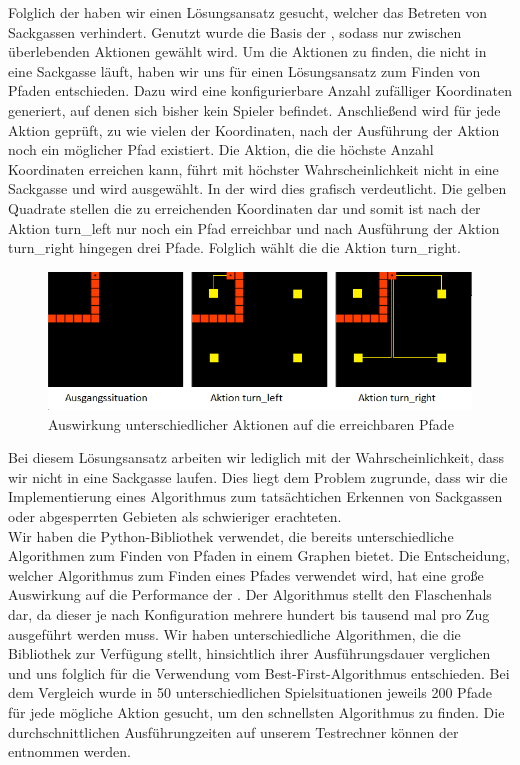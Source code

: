 Folglich der  haben wir einen Lösungsansatz gesucht, welcher das Betreten von Sackgassen
verhindert.
Genutzt wurde die Basis der , sodass nur zwischen überlebenden Aktionen gewählt wird.
Um die Aktionen zu finden, die nicht in eine Sackgasse läuft, haben wir uns für einen Lösungsansatz zum Finden von
Pfaden entschieden.
Dazu wird eine konfigurierbare Anzahl zufälliger Koordinaten generiert, auf denen sich bisher kein Spieler befindet.
Anschließend wird für jede Aktion geprüft, zu wie vielen der Koordinaten, nach der Ausführung der Aktion noch ein
möglicher Pfad existiert.
Die Aktion, die die höchste Anzahl Koordinaten erreichen kann, führt mit höchster Wahrscheinlichkeit
nicht in eine Sackgasse und wird ausgewählt.
In der  wird dies grafisch verdeutlicht.
Die gelben Quadrate stellen die zu erreichenden Koordinaten dar und somit ist nach der Aktion turn\_left nur noch ein
Pfad erreichbar und nach Ausführung der Aktion turn\_right hingegen drei Pfade.
Folglich wählt die  die Aktion turn\_right.

\begin{figure}[htb]
    \centering
    \includegraphics{Bilder/pathfinding_example.png}
    \caption{Auswirkung unterschiedlicher Aktionen auf die erreichbaren Pfade}
    \label{fig:sackgasse-pfade}
\end{figure}

Bei diesem Lösungsansatz arbeiten wir lediglich mit der Wahrscheinlichkeit, dass wir nicht in eine Sackgasse laufen.
Dies liegt dem Problem zugrunde, dass wir die Implementierung eines Algorithmus zum tatsächtichen Erkennen von
Sackgassen oder abgesperrten Gebieten als schwieriger erachteten. \\

Wir haben die Python-Bibliothek  verwendet, die bereits unterschiedliche Algorithmen zum Finden von
Pfaden in einem Graphen bietet.
Die Entscheidung, welcher Algorithmus zum Finden eines Pfades verwendet wird, hat eine große Auswirkung auf die
Performance der .
Der Algorithmus stellt den Flaschenhals dar, da dieser je nach Konfiguration mehrere hundert bis tausend mal pro
Zug ausgeführt werden muss.
Wir haben unterschiedliche Algorithmen, die die Bibliothek zur Verfügung stellt, hinsichtlich ihrer Ausführungsdauer verglichen und uns folglich für die
Verwendung vom Best-First-Algorithmus entschieden. 
Bei dem Vergleich wurde in 50 unterschiedlichen Spielsituationen jeweils 200 Pfade für jede mögliche Aktion gesucht, um
den schnellsten Algorithmus zu finden.
Die durchschnittlichen Ausführungzeiten auf unserem Testrechner können der
 entnommen werden.

